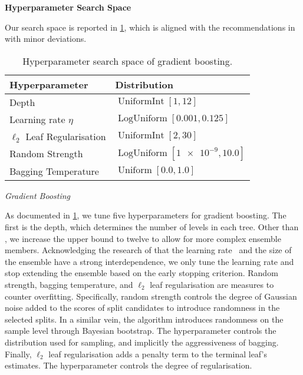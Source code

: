 \textbf{Hyperparameter Search Space}

Our search space is reported in \cref{tab:hyperparameter-space-gbm}, which is aligned with the recommendations in \textcites[][20]{prokhorenkovaCatBoostUnbiasedBoosting2018}[][18]{gorishniyRevisitingDeepLearning2021}[][4]{rubachevRevisitingPretrainingObjectives2022} with minor deviations.

\begin{table}[H]
    \centering
    \caption[Hyperparameter Search Space of Gradient Boosting]{Hyperparameter search space of gradient boosting.}
    \label{tab:hyperparameter-space-gbm}
    \begin{tabular}{@{}ll@{}}
        \toprule
        Hyperparameter               & Distribution                                           \\ \midrule
        Depth                        & $\operatorname{UniformInt}[1,12]$                         \\
        Learning rate $\eta$         & $\operatorname{LogUniform}[0.001, 0.125]$      \\
        $\ell_2$ Leaf Regularisation & $\operatorname{UniformInt}[2, 30]$                         \\
        Random Strength              & $\operatorname{LogUniform}[\num{1e-9}, 10.0]$          \\
        Bagging Temperature          & $\operatorname{Uniform}[0.0, 1.0]$                \\ \bottomrule
    \end{tabular}
\end{table}


\emph{Gradient Boosting}

As documented in \cref{tab:hyperparameter-space-gbm}, we tune five hyperparameters for gradient boosting. The first is the depth, which determines the number of levels in each tree. Other than \textcite[][]{gorishniyRevisitingDeepLearning2021}, we increase the upper bound to twelve to allow for more complex ensemble members. Acknowledging the research of \textcite[][14]{friedmanGreedyFunctionApproximation2001} that the learning rate \eta~and the size of the ensemble have a strong interdependence, we only tune the learning rate and stop extending the ensemble based on the early stopping criterion. Random strength, bagging temperature, and $\ell_2$ leaf regularisation are measures to counter overfitting. Specifically, random strength controls the degree of Gaussian noise added to the scores of split candidates to introduce randomness in the selected splits. In a similar vein, the algorithm introduces randomness on the sample level through Bayesian bootstrap. The hyperparameter controls the distribution used for sampling, and implicitly the aggressiveness of bagging. Finally, $\ell_2$ leaf regularisation adds a penalty term to the terminal leaf's estimates. The hyperparameter controls the degree of regularisation.

